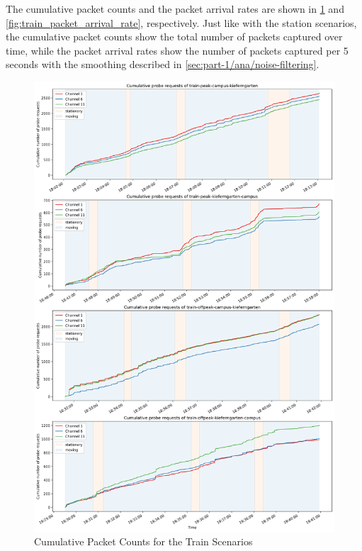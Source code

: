 \documentclass[sigconf,nonacm]{acmart}
\begin{document}
The cumulative packet counts and the packet arrival rates are shown in \cref{fig:train_cumulative_packet_counts} and \cref{fig:train_packet_arrival_rate}, respectively. Just like with the station scenarios, the cumulative packet counts show the total number of packets captured over time, while the packet arrival rates show the number of packets captured per 5 seconds with the smoothing described in \cref{sec:part-1/ana/noise-filtering}.

\begin{figure}
    \centering
    \includegraphics[width=\columnwidth]{images/part1/cumulative-packet-counts/train-scenarios.png}
    \caption{Cumulative Packet Counts for the Train Scenarios}
    \label{fig:train_cumulative_packet_counts}
\end{figure}
\end{document}

